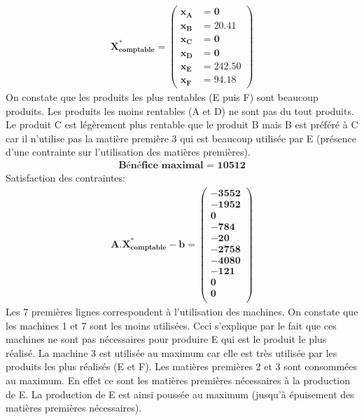 \documentclass[12pt]{article}
\begin{document}
\begin{align*} 
	\boldsymbol{X^{*}_{comptable} = 
   \left (
   \begin{aligned}
      x_{A} &= 0 \\
      x_{B} &= 20.41 \\
      x_{C} &= 0 \\
      x_{D} &= 0 \\
      x_{E} &= 242.50 \\
      x_{F} &= 94.18 
   \end{aligned}
   \right )}
\end{align*}
On constate que les produits les plus rentables (E puis F) sont beaucoup produits. Les produits
les moins rentables (A et D) ne sont pas du tout produits. Le produit C est légèrement plus rentable que le produit B mais B est préféré à C car il n'utilise pas la matière première 3 qui est beaucoup utilisée par E (présence d'une contrainte sur l'utilisation des matières premières).
\begin{align*}
\textbf{Bénéfice maximal = 10512}
\end{align*}
Satisfaction des contraintes: 
\begin{align*} 
	\boldsymbol{A.X^{*}_{comptable} - b = 	
   \left(
   \begin{aligned}    
      -3552 \\
      -1952 \\
      0 \\
      -784 \\
      -20 \\
      -2758 \\
      -4080 \\
      -121 \\
      0 \\
      0\\
   \end{aligned}
   \right )}
\end{align*}
Les 7 premières lignes correspondent à l'utilisation des machines. On constate que les
machines 1 et 7 sont les moins utilisées. Ceci s'explique par le fait que ces machines ne sont
pas nécessaires pour produire E qui est le produit le plus réalisé. La machine 3 est utilisée au maximum car elle est très utilisée par les produits les plus réalisés (E et F). Les matières premières 2 et 3 sont consommées au maximum. En effet ce sont les matières premières nécessaires à la production de E. La production de E est ainsi poussée au maximum (jusqu'à épuisement des matières premières nécessaires).
\end{document}

